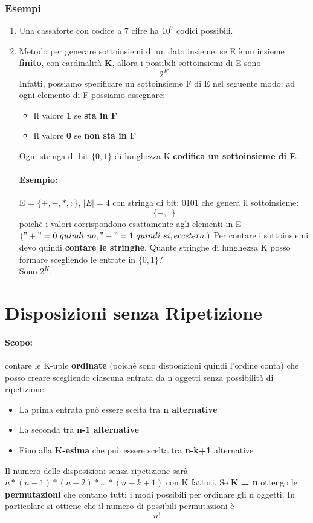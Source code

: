 \documentclass{report}
\begin{document}
\subsubsection{Esempi}
\begin{enumerate}
    \item Una cassaforte con codice a 7 cifre ha \(10^7\) codici possibili.
    \item Metodo per generare sottoinsiemi di un dato insieme: se E è un insieme \textbf{finito}, con cardinalità \textbf{K}, allora i possibili sottoinsiemi di E sono \[2^K\]
    Infatti, possiamo specificare un sottoinsieme F di E nel seguente modo: ad ogni elemento di F possiamo assegnare:\begin{itemize}
        \item Il valore \textbf{1} se \textbf{sta in F}
        \item Il valore \textbf{0} se \textbf{non sta in F}
    \end{itemize}
    Ogni stringa di bit \(\{0, 1\}\) di lunghezza K \textbf{codifica un sottoinsieme di E}.\\
    \paragraph{Esempio:} E = \(\{+, -, *, :\}\), \(|E| = 4\) con stringa di bit: 0101 che genera il sottoinsieme: \[\{-, :\}\] poichè i valori corrispondono esattamente agli elementi in E \(("+" = 0\ quindi\ no, "-" = 1\ quindi\ si, eccetera.)\)
    Per contare i sottoinsiemi devo quindi \textbf{contare le stringhe}. Quante stringhe di lunghezza K posso formare scegliendo le entrate in \(\{0, 1\}\)?\\ Sono \(2^K\).
\end{enumerate}
\section{Disposizioni senza Ripetizione}
\paragraph{Scopo:} contare le K-uple \textbf{ordinate} (poichè sono disposizioni quindi l'ordine conta) che posso creare scegliendo ciascuna entrata da n oggetti senza possibilità di ripetizione.
\begin{itemize}
    \item La prima entrata può essere scelta tra \textbf{n alternative}
    \item La seconda tra \textbf{n-1 alternative}
    \item Fino alla \textbf{K-esima} che può essere scelta tra \textbf{n-k+1} alternative
\end{itemize}
Il numero delle disposizioni senza ripetizione sarà \(n*(n-1)*(n-2)*...*(n-k+1)\) con K fattori. Se \textbf{K = n} ottengo le \textbf{permutazioni} che contano tutti i modi possibili per ordinare gli n oggetti. In particolare si ottiene che il numero di possibili permutazioni è \[n!\]
\end{document}
